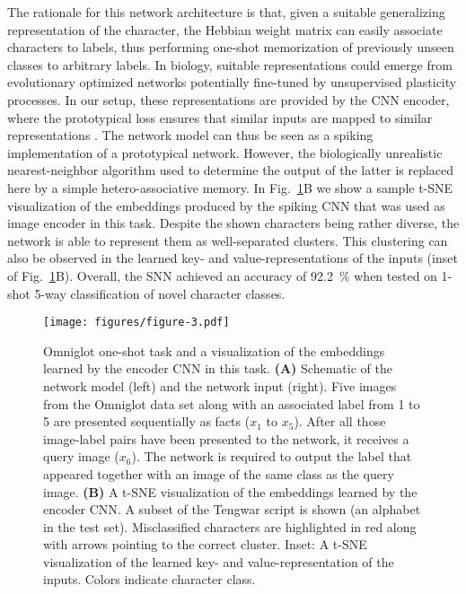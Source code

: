 \documentclass{article}
\begin{document}
The rationale for this network architecture is that, given a suitable generalizing representation of the character, the Hebbian weight matrix can easily associate characters to labels, thus performing one-shot memorization of previously unseen classes to arbitrary labels. In biology, suitable representations could emerge from evolutionary optimized networks potentially fine-tuned by unsupervised plasticity processes. In our setup, these representations are provided by the \gls{CNN} encoder, where the prototypical loss ensures that similar inputs are mapped to similar representations \cite{snell2017prototypical}. The network model can thus be seen as a spiking implementation of a prototypical network. However, the biologically unrealistic nearest-neighbor algorithm used to determine the output of the latter is replaced here by a simple hetero-associative memory. 
In Fig.~\ref{fig:fig3}B we show a sample t-SNE visualization of the embeddings produced by the spiking \gls{CNN} that was used as image encoder in this task. Despite the shown characters being rather diverse, the network is able to represent them as well-separated clusters. This clustering can also be observed in the learned key- and value-representations of the inputs (inset of Fig.~\ref{fig:fig3}B). Overall, the SNN achieved an accuracy of \SI{92.2}{\percent} when tested on 1-shot 5-way classification of novel character classes.


\begin{figure}\centering
\texttt{[image: figures/figure-3.pdf]}
\caption{Omniglot one-shot task and a visualization of the embeddings learned by the encoder \gls{CNN} in this task.
\textbf{(A)} Schematic of the network model (left) and the network input (right). Five images from the Omniglot data set along with an associated label from \num{1} to \num{5} are presented sequentially as facts ($x_1$ to $x_5$). After all those image-label pairs have been presented to the network, it receives a query image ($x_6$). The network is required to output the label that appeared together with an image of the same class as the query image.
\textbf{(B)} A t-SNE visualization of the embeddings learned by the encoder \gls{CNN}. A subset of the Tengwar script is shown (an alphabet in the test set). Misclassified characters are highlighted in red along with arrows pointing to the correct cluster. Inset: A t-SNE visualization of the learned key- and value-representation of the inputs. Colors indicate character class.}
\label{fig:fig3}
\end{figure}
\end{document}
